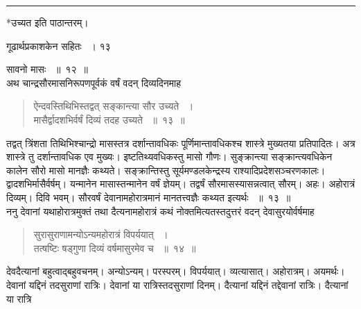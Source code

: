 \documentclass[11pt, openany]{book}
\begin{document}
\noindent \rule{\linewidth}{.5pt}

\begin{center}
*उच्यत इति पाठान्तरम्।
\end{center}

\newpage


\hspace{3cm} गूढार्थप्रकाशकेन सहितः ~। \hfill १३
\vspace{1cm}


\noindent सावनो मासः ~॥~१२~॥\\
\noindent अथ चान्द्रसौरमासनिरूपणपूर्वकं वर्षं वदन् दिव्यदिनमाह\textendash

 
\begin{quote}
{\ssi ऐन्दवस्तिथिभिस्तद्वत् सङ्कान्त्या सौर उच्यते ~।\\
मासैर्द्वादशभिर्वर्षं दिव्यं तदह उच्यते ~॥~१३~॥}
\end{quote}
\begin{sloppypar}
 तद्वत् त्रिंशता तिथिभिश्चान्द्रो मासस्तत्र दर्शान्तावधिकः पूर्णिमान्तावधिकश्च शास्त्रे मुख्यतया प्रतिपादितः। अत्र शास्त्रे तु दर्शान्तावधिक एव मुख्यः। इष्टतिथ्यवधिकस्तु मासो गौणः। सुङ्क्रान्त्या सङ्क्रान्त्यवधिकेन कालेन सौरो मासो मानज्ञैः कथ्यते। सङ्क्रान्तिस्तु सूर्यमण्डलकेन्द्रस्य राश्यादिप्रदेशसञ्चरणकालः। द्वादशभिर्मासैर्वर्षम्। यन्मानेन मासास्तन्मानेन वर्षं ज्ञेयम्। तद्वर्षं सौरमासस्यासन्नत्वात् सौरम्। अहः। अहोरात्रं दिव्यम्। दिवि भवम्। सौरवर्षं देवानामहोरात्रमानं मानतत्त्वज्ञैः कथ्यत इत्यर्थः ~॥~१३~॥\\
 \noindent ननु देवानां यथाहोरात्रमुक्तं तथा दैत्यनामहोरात्रं कथं नोक्तमित्यतस्तदुत्तरं वदन् देवासुरयोर्वर्षमाह\textendash
\end{sloppypar}


\begin{quote}
{\ssi सुरासुराणामन्योऽन्यमहोरात्रं विपर्ययात् ~।\\
तत्षष्टिः षड्गुणा दिव्यं वर्षमासुरमेव च ~॥~१४~॥}
\end{quote}
 देवदैत्यानां बहुत्वाद्बहुवचनम्। अन्योऽन्यम्। परस्परम्। विपर्ययात्। व्यत्यासात्। अहोरात्रम्। अयमर्थः। देवानां यद्दिनं तदसुराणां रात्रिः। देवानां या रात्रिस्तदसुराणां दिनम्। दैत्यानां यद्दिनं तद्देवानां रात्रिः। दैत्यानां या रात्रि\textendash
\end{document}
